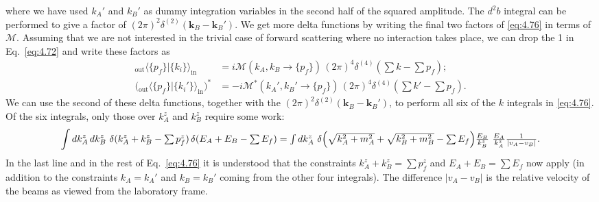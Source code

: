 where we have used $k_A'$ and $k_B'$ as dummy integration variables in the
second half of the squared amplitude.  The $d^2b$ integral can be performed
to give a factor of $(2\pi)^2\delta^{(2)}(\mathbf{k}_B-\mathbf{k}_B')$.  We
get more delta functions by writing the final two factors of \eqref{eq:4.76}
in terms of $\mathcal{M}$.  Assuming that we are not interested in the trivial
case of forward scattering where no interaction takes place, we can drop the
1 in Eq.~\eqref{eq:4.72} and write these factors as
\begin{align}
  {}_{\mathrm{out}}\langle\{p_f\}|\{k_i\}\rangle_{\mathrm{in}}
    &= i\mathcal{M}(k_A, k_B \to \{p_f\})\,
      (2\pi)^4\delta^{(4)}(\textstyle\sum k - \sum p_f);\\
  \bigl( {}_{\mathrm{out}}\langle\{p_f\}|\{k_i'\}\rangle_{\mathrm{in}} \bigr)^{*}
    &= -i\mathcal{M}^{*}(k_A', k_B' \to \{p_f\})\,
      (2\pi)^4\delta^{(4)}(\textstyle\sum k' - \sum p_f) .
\end{align}
We can use the second of these delta functions, together with the
$(2\pi)^2\delta^{(2)}(\mathbf{k}_B-\mathbf{k}_B')$, to perform all six of the
$k$ integrals in \eqref{eq:4.76}.  Of the six integrals, only those over
$k_A^z$ and $k_B^z$ require some work:
\begin{equation}
  \int dk_A^z\,dk_B^z\ \delta(k_A^z+k_B^z-\textstyle\sum p_f^z)\,
    \delta(E_A+E_B-\textstyle\sum E_f)
  = \int dk_A^z\ \delta\Bigl(
    \sqrt{k_A^2+m_A^2} + \sqrt{k_B^2+m_B^2} - \textstyle\sum E_f \Bigr)
    \frac{E_B}{k_B^z}\ \frac{E_A}{k_A^z}
    \frac{1}{|v_A - v_B|} .
  \label{eq:4.77}
\end{equation}
In the last line and in the rest of Eq.~\eqref{eq:4.76} it is understood that
the constraints $k_A^z+k_B^z = \sum p_f^z$ and $E_A+E_B = \sum E_f$ now apply
(in addition to the constraints $k_A = k_A'$ and $k_B = k_B'$ coming from the
other four integrals).  The difference $|v_A - v_B|$ is the relative velocity
of the beams as viewed from the laboratory frame.

